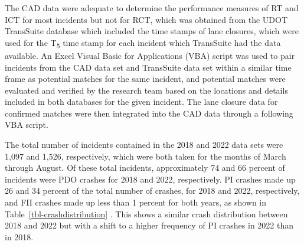 \documentclass[
  letterpaper,
  authoryear]{elsarticle}
\begin{document}
The CAD data were adequate to determine the performance measures of RT
and ICT for most incidents but not for RCT, which was obtained from the
UDOT TransSuite database which included the time stamps of lane
closures, which were used for the T\textsubscript{5} time stamp for each
incident which TransSuite had the data available. An Excel Visual Basic
for Applications (VBA) script was used to pair incidents from the CAD
data set and TransSuite data set within a similar time frame as
potential matches for the same incident, and potential matches were
evaluated and verified by the research team based on the locations and
details included in both databases for the given incident. The lane
closure data for confirmed matches were then integrated into the CAD
data through a following VBA script.

The total number of incidents contained in the 2018 and 2022 data sets
were 1,097 and 1,526, respectively, which were both taken for the months
of March through August. Of these total incidents, approximately 74 and
66 percent of incidents were PDO crashes for 2018 and 2022,
respectively. PI crashes made up 26 and 34 percent of the total number
of crashes, for 2018 and 2022, respectively, and FII crashes made up
less than 1 percent for both years, as shown in
Table~\ref{tbl-crashdistribution} . This shows a similar crash
distribution between 2018 and 2022 but with a shift to a higher
frequency of PI crashes in 2022 than in 2018.
\end{document}

